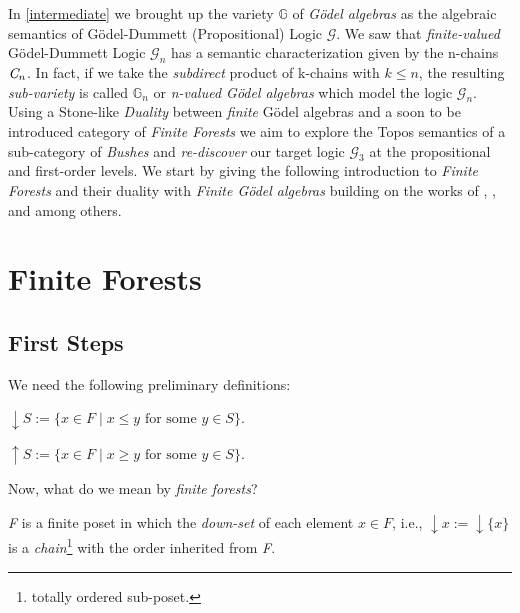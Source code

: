 
In \ref{intermediate} we brought up the variety $\mathbb{G}$ of \emph{Gödel algebras} as the algebraic semantics of Gödel-Dummett (Propositional) Logic $\mathcal{G}$. \newline
We saw that \emph{finite-valued} Gödel-Dummett Logic $\mathcal{G}_n$ has a semantic characterization given by the n-chains $\emph{C}_n$. \newline
In fact, if we take the \emph{subdirect} product of k-chains with $k \leq n$, the resulting \emph{sub-variety} is called $\mathbb{G}_n$ or \emph{n-valued Gödel algebras} which model the logic $\mathcal{G}_n$. \newline
Using a Stone-like \emph{Duality} between \emph{finite} Gödel algebras and a soon to be introduced category of \emph{Finite Forests} we aim to explore the Topos semantics of a sub-category of \emph{Bushes} and \emph{re-discover} our target logic $\mathcal{G}_3$ at the propositional and first-order levels. 
\newline
We start by giving the following introduction to \emph{Finite Forests} and their duality with \emph{Finite Gödel algebras} building on the works of \cite{towards}, \cite{manyval}, \cite{recursive} and \cite{computing} among others.

\newpage
\section{Finite Forests}
\label{chapter02}

\subsection{First Steps}

We need the following preliminary definitions:

\begin{definition} 
	$\downarrow S := \{ x \in F \;|\; x \leq y \text{ for some } y\in S \}$.
\end{definition}

\begin{definition} 
	$\uparrow S := \{ x \in F \;|\; x \geq y \text{ for some } y\in S \}$.
\end{definition}

Now, what do we mean by \emph{finite forests}? 

\begin{definition}
	\emph{F} is a finite poset in which the \emph{down-set} of each element $x \in F$, i.e., $ \downarrow x :=  \downarrow \{x\} $ is a \emph{chain}\footnote{totally ordered sub-poset.} with the order inherited from \emph{F}.
\end{definition}

